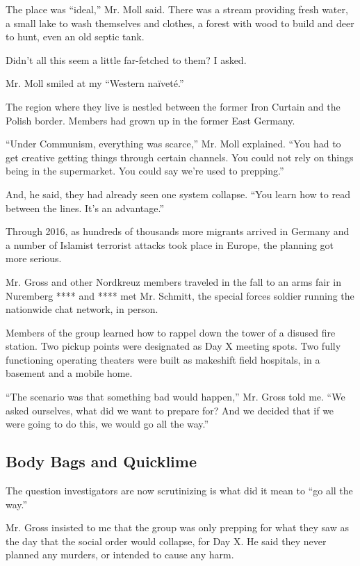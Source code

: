 The place was ``ideal,'' Mr. Moll said. There was a stream providing
fresh water, a small lake to wash themselves and clothes, a forest with
wood to build and deer to hunt, even an old septic tank.

Didn't all this seem a little far-fetched to them? I asked.

Mr. Moll smiled at my ``Western naïveté.''

The region where they live is nestled between the former Iron Curtain
and the Polish border. Members had grown up in the former East Germany.

``Under Communism, everything was scarce,'' Mr. Moll explained. ``You
had to get creative getting things through certain channels. You could
not rely on things being in the supermarket. You could say we're used to
prepping.''

And, he said, they had already seen one system collapse. ``You learn how
to read between the lines. It's an advantage.''

Through 2016, as hundreds of thousands more migrants arrived in Germany
and a number of Islamist terrorist attacks took place in Europe, the
planning got more serious.

Mr. Gross and other Nordkreuz members traveled in the fall to an arms
fair in Nuremberg **** and **** met Mr. Schmitt, the special forces
soldier running the nationwide chat network, in person.

Members of the group learned how to rappel down the tower of a disused
fire station. Two pickup points were designated as Day X meeting spots.
Two fully functioning operating theaters were built as makeshift field
hospitals, in a basement and a mobile home.

``The scenario was that something bad would happen,'' Mr. Gross told me.
``We asked ourselves, what did we want to prepare for? And we decided
that if we were going to do this, we would go all the way.''

\hypertarget{body-bags-and-quicklime}{%
\subsection{Body Bags and Quicklime}\label{body-bags-and-quicklime}}

The question investigators are now scrutinizing is what did it mean to
``go all the way.''

Mr. Gross insisted to me that the group was only prepping for what they
saw as the day that the social order would collapse, for Day X. He said
they never planned any murders, or intended to cause any harm.

